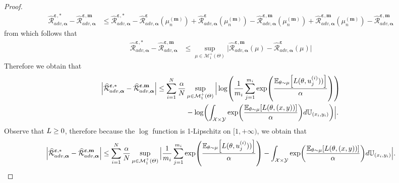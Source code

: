 \begin{proof}
\begin{align*}
\widehat{\mathcal{R}}^{\bm{\varepsilon},*}_{adv,\bm{\alpha}} - \widehat{\mathcal{R}}^{\bm{\varepsilon},\textbf{m}}_{adv,\bm{\alpha}}&\leq \widehat{\mathcal{R}}^{\bm{\varepsilon},*}_{adv,\bm{\alpha}} -
\widehat{\mathcal{R}}^{\bm{\varepsilon}}_{adv,\bm{\alpha}}(\mu_n^{(\bm{m})})
+\widehat{\mathcal{R}}^{\bm{\varepsilon}}_{adv,\bm{\alpha}}(\mu_n^{(\bm{m})}) - \widehat{\mathcal{R}}^{\bm{\varepsilon},\textbf{m}}_{adv,\bm{\alpha}}(\mu_n^{(\bm{m})}) + \widehat{\mathcal{R}}^{\bm{\varepsilon},\textbf{m}}_{adv,\bm{\alpha}}(\mu_n^{(\bm{m})}) - \widehat{\mathcal{R}}^{\bm{\varepsilon},\textbf{m}}_{adv,\bm{\alpha}}
\end{align*}
from which follows that 
\begin{align*}
\widehat{\mathcal{R}}^{\bm{\varepsilon},*}_{adv,\bm{\alpha}} - \widehat{\mathcal{R}}^{\bm{\varepsilon},\textbf{m}}_{adv,\bm{\alpha}}&\leq  \sup_{\mu\in \mathcal{M}^+_1(\Theta)}\Big|\widehat{\mathcal{R}}^{\bm{\varepsilon},\textbf{m}}_{adv,\bm{\alpha}}(\mu) - \widehat{\mathcal{R}}^{\bm{\varepsilon}}_{adv,\bm{\alpha}}(\mu) \Big| 
\end{align*}
Therefore we obtain that 
\begin{align*}
\Big| \widehat{\mathcal{R}}^{\bm{\varepsilon},*}_{adv,\bm{\alpha}} - \widehat{\mathcal{R}}^{\bm{\varepsilon},\textbf{m}}_{adv,\bm{\alpha}}\Big |\leq 
\sum_{i=1}^\numsamples\frac{\alpha}{\numsamples}  &\sup_{\mu\in \mathcal{M}^+_1(\Theta)}\Big|\log\left(\frac{1}{m_i}\sum_{j=1}^{m_i}\exp\left(\frac{\mathbb{E}_{\theta \sim \mu}\left[\loss(\theta,u_j^{(i)}))\right]}{\alpha}\right)\right)\\
    &- \log\left(\int_{\mathcal{X}\times\mathcal{Y}}\exp\left(\frac{\mathbb{E}_{\theta \sim \mu}\left[\loss(\theta,(x,y))\right]}{\alpha}\right) d\mathbb{U}_{(x_i,y_i)} \right)\Big|.
\end{align*}
Observe that $L\geq 0$, therefore because the $\log$ function is 1-Lipschitz on $[1,+\infty)$, we obtain that 
\begin{align*}
\Big| \widehat{\mathcal{R}}^{\bm{\varepsilon},*}_{adv,\bm{\alpha}} - \widehat{\mathcal{R}}^{\bm{\varepsilon},\textbf{m}}_{adv,\bm{\alpha}}\Big |
\leq 
\sum_{i=1}^\numsamples\frac{\alpha}{\numsamples}  \sup_{\mu\in \mathcal{M}^+_1(\Theta)}\Big | \frac{1}{m_i}\sum_{j=1}^{m_i}\exp\left(\frac{\mathbb{E}_{\theta \sim \mu}\left[\loss(\theta,u_j^{(i)}))\right]}{\alpha}\right)
    - \int_{\mathcal{X}\times\mathcal{Y}}\exp\left(\frac{\mathbb{E}_{\theta \sim \mu}\left[\loss(\theta,(x,y))\right]}{\alpha}\right) d\mathbb{U}_{(x_i,y_i)} \Big|.

\end{align*}
\end{proof}
